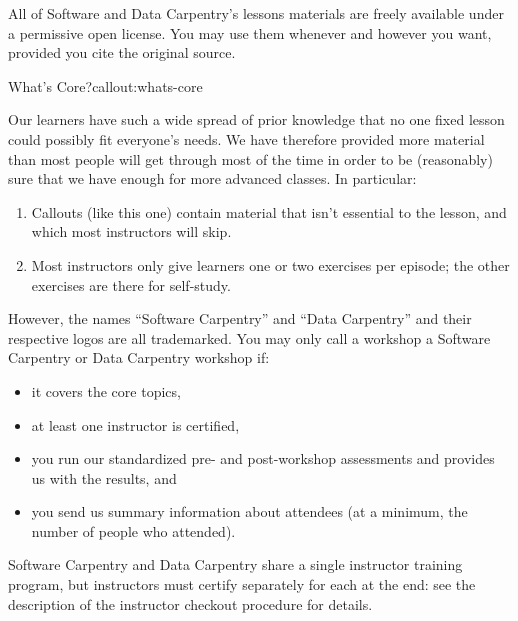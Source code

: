 All of Software and Data Carpentry's lessons materials are freely
available under a permissive open license. You may use
them whenever and however you want, provided you cite the original
source.

\begin{callout}{What's Core?}{callout:whats-core}

Our learners have such a wide spread of prior knowledge that no one
fixed lesson could possibly fit everyone's needs. We have therefore
provided more material than most people will get through most of the
time in order to be (reasonably) sure that we have enough for more
advanced classes. In particular:

\begin{enumerate}
\item
  Callouts (like this one) contain material that isn't essential to the
  lesson, and which most instructors will skip.
\item
  Most instructors only give learners one or two exercises per episode;
  the other exercises are there for self-study.
\end{enumerate}
\end{callout}


However, the names ``Software Carpentry'' and ``Data Carpentry'' and
their respective logos are all trademarked. You may only call a workshop
a Software Carpentry or Data Carpentry workshop if:

\begin{itemize}
\item
  it covers the core topics,
\item
  at least one instructor is certified,
\item
  you run our standardized pre- and post-workshop assessments and
  provides us with the results, and
\item
  you send us summary information about attendees (at a minimum, the
  number of people who attended).
\end{itemize}


Software Carpentry and Data Carpentry share a single instructor training
program, but instructors must certify separately for each at the end:
see the description of the
instructor checkout procedure for details.


